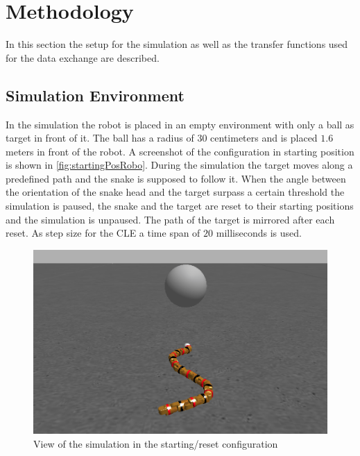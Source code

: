 
\chapter{Methodology}\label{chapter:Methology}
In this section the setup for the simulation as well as the transfer functions used for the data exchange are described.

\section{Simulation Environment}
In the simulation the robot is placed in an empty environment with only a ball as target in front of it. The ball has a radius of $30$ centimeters and is placed $1.6$ meters in front of the robot. A screenshot of the configuration in starting position is shown in \autoref{fig:startingPosRobo}. During the simulation the target moves along a predefined path and the snake is supposed to follow it. When the angle between the orientation of the snake head and the target surpass a certain threshold the simulation is paused, the snake and the target are reset to their starting positions and the simulation is unpaused. The path of the target is mirrored after each reset. As step size for the CLE a time span of $20$ milliseconds is used.

\begin{figure}[htpb]
  \centering
  \includegraphics[width=\textwidth]{figures/startingPosition.png}
  \caption{View of the simulation in the starting/reset configuration }
  \label{fig:startingPosRobo}
\end{figure}



